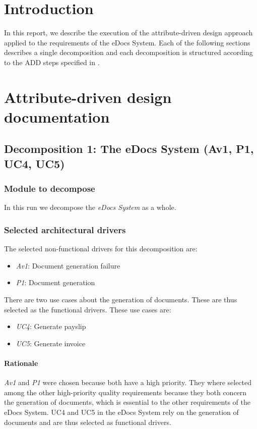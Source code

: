 \documentclass[a4paper,10pt]{article}
\begin{document}


\tableofcontents
\newpage

\section{Introduction}\label{sec:introduction}
In this report, we describe the execution of the attribute-driven design approach applied to the requirements of the eDocs System. Each of the following sections describes a single decomposition and each decomposition is structured according to the ADD  steps specified in \cite{SWArchinpractice}.
\section{Attribute-driven design documentation}\label{sec:add}
\subsection{Decomposition 1: The eDocs System (Av1, P1, UC4, UC5)}
\subsubsection{Module to decompose}
In this run we decompose the \emph{eDocs System} as a whole.

\subsubsection{Selected architectural drivers}
The selected non-functional drivers for this decomposition are:

\begin{itemize}
    \item \emph{Av1}: Document generation failure
    \item \emph{P1}: Document generation
\end{itemize}

There are two use cases about the generation of documents. These are thus selected as the functional drivers. These use cases are:

\begin{itemize}
    \item \emph{UC4}: Generate payslip
    \item \emph{UC5}: Generate invoice
\end{itemize}

\paragraph{Rationale}
\emph{Av1} and \emph{P1} were chosen because both have a high priority. They where selected among the other high-priority quality requirements because they both concern the generation of documents, which is essential to the other requirements of the eDocs System.
UC4 and UC5 in the eDocs System rely on the generation of documents and are thus selected as functional drivers.
\end{document}
